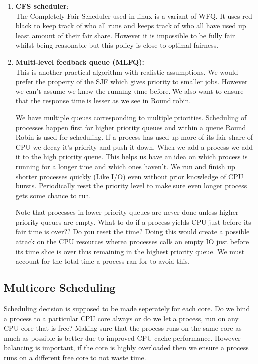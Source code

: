 \documentclass[12pt]{article}
\newcommand{\tbox}[1]{\noindent\fbox{\parbox{\textwidth}{#1}}}
\begin{document}
\begin{enumerate}
\item 
\textbf{CFS scheduler}:\\The Completely Fair Scheduler used in linux is a variant of WFQ. It uses red-black to keep track of who all runs and keeps track of who all have used up least amount of their fair share.
However it is impossible to be fully fair whilst being reasonable but this policy is close to optimal fairness.


\item \textbf{Multi-level feedback queue (MLFQ):} \\
This is another practical algorithm with realistic assumptions. We would prefer the property of the SJF which gives priority to smaller jobs. However we can't assume we know the running time before.
We also want to ensure that the response time is lesser as we see in Round robin. 

We have multiple queues corresponding to multiple priorities. Scheduling of processes happen first for higher priority queues and within a queue Round Robin is used for scheduling. If a process has used up more of its fair share of CPU we decay it's priority and push it down. When we 
add a process we add it to the high priority queue. This helps us have an idea on which process is running for a longer time and which ones haven't. We run and finish up shorter processes quickly (Like I/O) even without prior knowledge of CPU bursts. Periodically reset the priority level to make sure even longer
process gets some chance to run.

Note that processes in lower priority queues are never done unless higher priority queues are empty. What to do if a process yields CPU just before its fair time is over?? Do you
reset the time? Doing this would create a possible attack on the CPU resources wherea processes calls an empty IO just before its time slice is over thus remaining in the highest priority queue. We must
account for the total time a process ran for to avoid this. 
\end{enumerate}

\newpage
\noindent\tbox{
    \begin{center}
    \textbf{\Huge Lecture 10}
    \end{center}
}

\subsection{Multicore Scheduling}
Scheduling decision is supposed to be made seperately for each core. Do we bind a process to a particular CPU core always or do we let a process,
run on any CPU core that is free? Making sure that the process runs on the same core as much as possible is better due to improved CPU cache performance.
However balancing is important, if the core is highly overloaded then we ensure a process runs on a different free core to not waste time. 
\end{document}
